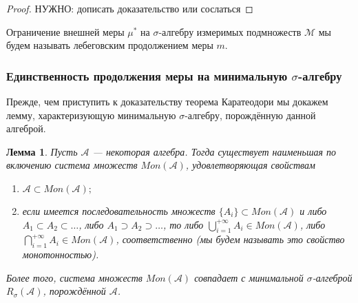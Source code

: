 \documentclass[12pt]{article}
\newtheorem{lemma}[theorem]{Лемма}
\numberwithin{theorem}{section}
\theoremstyle{definition}
\newcommand{\calA}{\mathcal{A}}
\newcommand{\calM}{\mathcal{M}}
\newcommand{\defin}[2]{\hypertarget{#2}{{\color{red} #1}}}
\newcommand{\TODO}[1]{\textcolor{todocolor}{НУЖНО: #1}}
\begin{document}
	\begin{proof}
		\TODO{дописать доказательство или сослаться}
	\end{proof}
	
	Ограничение внешней меры $ \mu^* $ на $ \sigma $-алгебру измеримых подмножеств $ \calM $ мы будем называть 
	\defin{лебеговским продолжением меры $ m $}{lebesgue-extention}.
	
	
	\subsubsection{Единственность продолжения меры на минимальную $ \sigma $-алгебру}
	
	Прежде, чем приступить к доказательству теорема Каратеодори мы докажем лемму, 
	характеризующую минимальную $ \sigma $-алгебру,
	порождённую данной алгеброй.
	
	\begin{lemma} \label{min sigma algebra monotonic characterization}
		Пусть $ \calA $ --- некоторая алгебра.
		Тогда существует наименьшая по включению система множеств $ Mon(\calA) $,
		удовлетворяющая свойствам
		 \begin{enumerate}
		 	\item $ \calA \subset Mon(\calA) ;$
		 	\item если имеется последовательность множеств $ \{A_i\} \subset Mon(\calA) $
		 	и либо $ A_1 \subset A_2 \subset \ldots $, либо $ A_1 \supset A_2 \supset \ldots $,
		 	то либо $ \bigcup\limits_{i = 1}^{+\infty} A_i \in Mon(\calA) $,
		 	либо $ \bigcap\limits_{i = 1}^{+\infty} A_i \in Mon(\calA) $, соответственно
		 	(мы будем называть это свойство \defin{монотонностью}{monotonic-class}).
		 \end{enumerate}
		 Более того, система множеств $ Mon(\calA) $ 
		 совпадает с минимальной $ \sigma $-алгеброй $ R_{\sigma}(\calA) $,
		 порождённой $ \calA $.
	\end{lemma}
	
\end{document}
